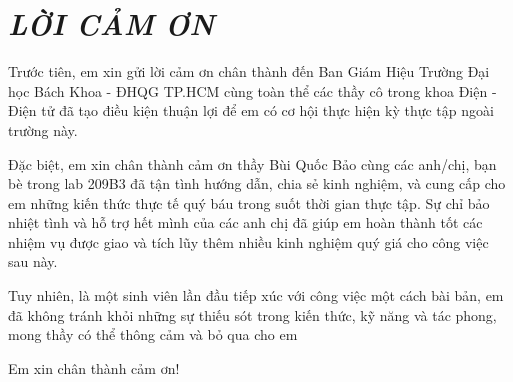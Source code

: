 \section*{\textbf{\textit{LỜI CẢM ƠN}}}

Trước tiên, em xin gửi lời cảm ơn chân thành đến Ban Giám Hiệu Trường Đại học Bách Khoa - ĐHQG TP.HCM cùng toàn thể các thầy cô trong khoa Điện - Điện tử đã tạo điều kiện thuận lợi để em có cơ hội thực hiện kỳ thực tập ngoài trường này.

Đặc biệt, em xin chân thành cảm ơn thầy Bùi Quốc Bảo cùng các anh/chị, bạn bè trong lab 209B3 đã tận tình hướng dẫn, chia sẻ kinh nghiệm, và cung cấp cho em những kiến thức thực tế quý báu trong suốt thời gian thực tập. Sự chỉ bảo nhiệt tình và hỗ trợ hết mình của các anh chị đã giúp em hoàn thành tốt các nhiệm vụ được giao và tích lũy thêm nhiều kinh nghiệm quý giá cho công việc sau này.

Tuy nhiên, là một sinh viên lần đầu tiếp xúc với công việc một cách bài bản, em đã không tránh khỏi những sự thiếu sót trong kiến thức, kỹ năng và tác phong, mong thầy có thể thông cảm và bỏ qua cho em

Em xin chân thành cảm ơn!

\clearpage